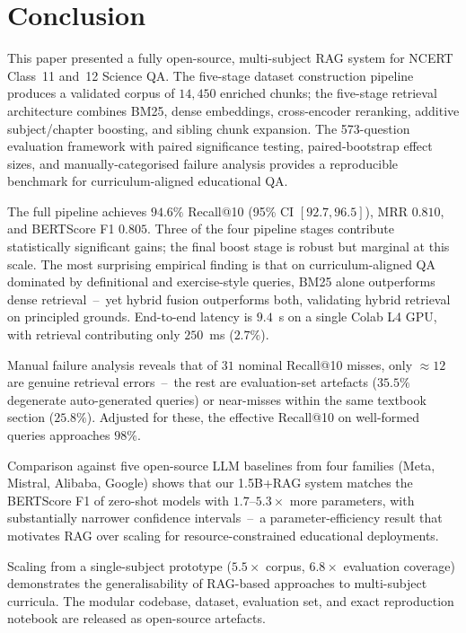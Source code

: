 \documentclass[conference]{IEEEtran}
\begin{document}
\section{Conclusion}
This paper presented a fully open-source, multi-subject RAG system for NCERT Class~11 and~12 Science QA. The five-stage dataset construction pipeline produces a validated corpus of $14{,}450$ enriched chunks; the five-stage retrieval architecture combines BM25, dense embeddings, cross-encoder reranking, additive subject/chapter boosting, and sibling chunk expansion. The 573-question evaluation framework with paired significance testing, paired-bootstrap effect sizes, and manually-categorised failure analysis provides a reproducible benchmark for curriculum-aligned educational QA.

The full pipeline achieves $94.6\%$ Recall@10 (95\% CI $[92.7, 96.5]$), MRR $0.810$, and BERTScore F1 $0.805$. Three of the four pipeline stages contribute statistically significant gains; the final boost stage is robust but marginal at this scale. The most surprising empirical finding is that on curriculum-aligned QA dominated by definitional and exercise-style queries, BM25 alone outperforms dense retrieval~--~yet hybrid fusion outperforms both, validating hybrid retrieval on principled grounds. End-to-end latency is $9.4$~s on a single Colab L4 GPU, with retrieval contributing only $250$~ms ($2.7\%$).

Manual failure analysis reveals that of $31$ nominal Recall@10 misses, only ${\approx}12$ are genuine retrieval errors~--~the rest are evaluation-set artefacts ($35.5\%$ degenerate auto-generated queries) or near-misses within the same textbook section ($25.8\%$). Adjusted for these, the effective Recall@10 on well-formed queries approaches $98\%$.

Comparison against five open-source LLM baselines from four families (Meta, Mistral, Alibaba, Google) shows that our 1.5B+RAG system matches the BERTScore F1 of zero-shot models with $1.7$--$5.3\times$ more parameters, with substantially narrower confidence intervals~--~a parameter-efficiency result that motivates RAG over scaling for resource-constrained educational deployments.

Scaling from a single-subject prototype ($5.5\times$ corpus, $6.8\times$ evaluation coverage) demonstrates the generalisability of RAG-based approaches to multi-subject curricula. The modular codebase, dataset, evaluation set, and exact reproduction notebook are released as open-source artefacts.
\end{document}
